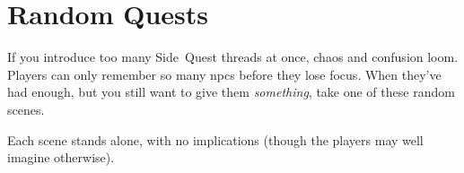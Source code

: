 \section{Random Quests}

If you introduce too many Side~Quest threads at once, chaos and confusion loom.
Players can only remember so many \glspl{npc} before they lose focus.
When they've had enough, but you still want to give them \emph{something}, take one of these random scenes.

Each scene stands alone, with no implications (though the players may well imagine otherwise).


